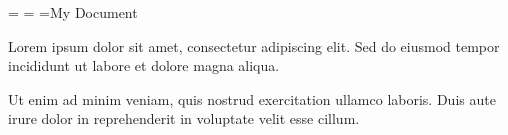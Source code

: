 

\bindinglefttrue
\doublesidedtrue
\notesoutertrue

\headinner={\folio}
\headmiddle={}
\headouter={My Document}

Lorem ipsum dolor sit amet, consectetur adipiscing elit.%
Sed do eiusmod tempor incididunt ut labore et dolore magna aliqua.

\smallskip
Ut enim ad minim veniam, quis nostrud exercitation ullamco laboris.%
Duis aute irure dolor in reprehenderit in voluptate velit esse cillum.

\bye
